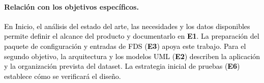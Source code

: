 \paragraph{Relación con los objetivos específicos.}
\textcolor{black}{En Inicio, el análisis del estado del arte, las necesidades y los datos disponibles permite definir el alcance del producto y documentarlo en \textbf{E1}. La preparación del paquete de configuración y entradas de FDS (\textbf{E3}) apoya este trabajo. Para el segundo objetivo, la arquitectura y los modelos UML (\textbf{E2}) describen la aplicación y la organización prevista \textcolor{black}{del dataset}. La estrategia inicial de pruebas (\textbf{E6}) establece cómo se verificará el diseño.}
